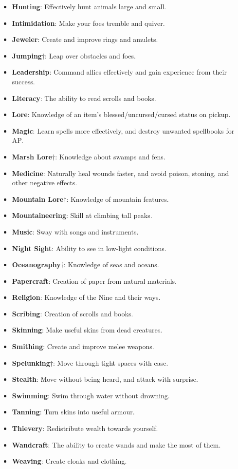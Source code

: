 \begin{itemize}
\item {\bf Hunting}: Effectively hunt animals large and small. 
\item {\bf Intimidation}: Make your foes tremble and quiver. 
\item {\bf Jeweler}: Create and improve rings and amulets. 
\item {\bf Jumping}$\dagger$: Leap over obstacles and foes.
\item {\bf Leadership}: Command allies effectively and gain experience from their success. 
\item {\bf Literacy}: The ability to read scrolls and books.
\item {\bf Lore}: Knowledge of an item's blessed/uncursed/cursed status on pickup.
\item {\bf Magic}: Learn spells more effectively, and destroy unwanted spellbooks for AP.
\item {\bf Marsh Lore}$\dagger$: Knowledge about swamps and fens. 
\item {\bf Medicine}: Naturally heal wounds faster, and avoid poison, stoning, and other negative effects.
\item {\bf Mountain Lore}$\dagger$: Knowledge of mountain features. 
\item {\bf Mountaineering}: Skill at climbing tall peaks. 
\item {\bf Music}: Sway with songs and instruments. 
\item {\bf Night Sight}: Ability to see in low-light conditions. 
\item {\bf Oceanography}$\dagger$: Knowledge of seas and oceans. 
\item {\bf Papercraft}: Creation of paper from natural materials. 
\item {\bf Religion}: Knowledge of the Nine and their ways. 
\item {\bf Scribing}: Creation of scrolls and books. 
\item {\bf Skinning}: Make useful skins from dead creatures. 
\item {\bf Smithing}: Create and improve melee weapons.
\item {\bf Spelunking}$\dagger$: Move through tight spaces with ease.
\item {\bf Stealth}: Move without being heard, and attack with surprise.
\item {\bf Swimming}: Swim through water without drowning.
\item {\bf Tanning}: Turn skins into useful armour.
\item {\bf Thievery}: Redistribute wealth towards yourself.
\item {\bf Wandcraft}: The ability to create wands and make the most of them.
\item {\bf Weaving}: Create cloaks and clothing.
\end{itemize}

